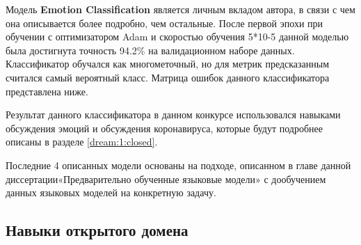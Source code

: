 Модель \textbf{Emotion Classification} является личным вкладом автора, в связи с чем она описывается более подробно, чем остальные. После первой эпохи при обучении с оптимизатором Adam и скоростью обучения 5*10-5 данной моделью была достигнута точность 94.2\% на валидационном наборе данных. Классификатор обучался как многометочный, но для метрик предсказанным считался самый вероятный класс. Матрица ошибок данного классификатора представлена ниже.


\begin{table}[htbp]
\centering
\caption {Матрица ошибок классификатора эмоций из Alexa Prize Challenge 3}
\label{tab:dream1}%
\end{table}



Результат данного классификатора в данном конкурсе использовался навыками обсуждения эмоций и обсуждения коронавируса, которые будут подробнее описаны в разделе \ref{dream:1:closed}.

Последние 4 описанных модели основаны на подходе, описанном в главе данной диссертации«Предварительно обученные языковые модели» с дообучением данных языковых моделей на конкретную задачу.

\subsection{Навыки открытого домена}

